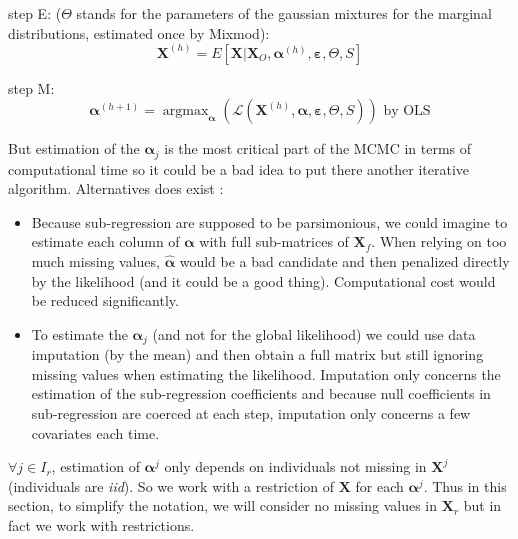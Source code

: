 \documentclass[11pt,a4paper]{report}
\begin{document}
step E: ($\Theta$ stands for the parameters of the gaussian mixtures for the marginal distributions, estimated once by Mixmod):
\begin{equation}
	\boldsymbol{X}^{(h)}=E[\boldsymbol{X}|\boldsymbol{X}_{O},\boldsymbol{\alpha}^{(h)},\boldsymbol{\varepsilon},\Theta,S]
\end{equation}			
	
	step M:	
\begin{equation}
	\boldsymbol{\alpha}^{(h+1)}=\operatorname{argmax}_{\boldsymbol{\alpha}}(\mathcal{L}(\boldsymbol{X}^{(h)},\boldsymbol{\alpha},\boldsymbol{\varepsilon},\Theta,S)) \textrm{ by OLS}
\end{equation}	
	
		
			But estimation of the $\boldsymbol{\alpha}_j$ is the most critical part of the MCMC in terms of computational time so it could be a bad idea to put there another iterative algorithm. 
			Alternatives does exist :
			\begin{itemize}
				\item Because sub-regression are supposed to be parsimonious, we could imagine to estimate each column of $\boldsymbol{\alpha}$ with full sub-matrices of $\boldsymbol{X}_f$. When relying on too much missing values, $\hat{\boldsymbol{\alpha}}$ would be a bad candidate and then penalized directly by the likelihood (and it could be a good thing). Computational cost would be reduced significantly.
				\item To estimate the $\boldsymbol{\alpha}_j$ (and not for the global likelihood) we could use data imputation (by the mean) and then obtain a full matrix but still ignoring missing values when estimating the likelihood. Imputation only concerns the estimation of the sub-regression coefficients and because null coefficients in sub-regression are coerced at each step, imputation only concerns a few covariates each time.
			\end{itemize}
			
			
			 $\forall j \in I_r$, estimation of $\boldsymbol{\alpha}^j$ only depends on individuals not missing in $\boldsymbol{X}^j$ (individuals are {\it iid}).
			 So we work with a restriction of $\boldsymbol{X}$ for each $\boldsymbol{\alpha}^j$. Thus in this section, to simplify the notation, we will consider no missing values in $\boldsymbol{X}_r$ but in fact we work with restrictions.
			
\end{document}
